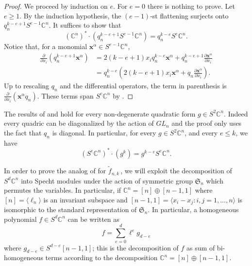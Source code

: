 \documentclass{toc}
\newcommand{\vvirg}{ , \dots , }
\newcommand{\bfx}{\mathbf{x}}
\newcommand{\bbC}{\mathbb{C}}
\newcommand{\frakS}{\mathfrak{S}}
\renewcommand{\tilde}[1]{\widetilde{#1}}
\def\BC{\mathbb C}
\begin{document}
\begin{proof} 
 We proceed by induction on $e$. For $e = 0$ there is nothing to prove. Let $e\geq 1$. By the induction hypothesis, the $(e -1)$-st flattening surjects onto $ q_n^{k-e+1} S^{e-1} \BC^{n}$. It suffices to show that 
 \[
  (\BC^{n})^* \cdot (q_n^{k-e+1} S^{e-1} \BC^{n}) = q_n^{k-e} S^e \BC^n.
 \]
Notice that, for a monomial $\bfx^\alpha \in S^{e-1} \BC^{n}$, 
\begin{align*}
\frac{\partial}{\partial x_i} (q_n^{k-e+1} \bfx^\alpha ) &= 2(k-e+1) x_i q_n^{k-e} \bfx^\alpha  + q_n^{k-e+1} \frac{\partial \bfx^\alpha }{\partial x_i}  \\ 
&= q_n^{k-e} \left(2(k-e+1) x_i  \bfx^\alpha  + q_n \frac{\partial \bfx^\alpha}{\partial x_i}\right).
\end{align*}
Up to rescaling $q_n$ and the differential operators, the term in parenthesis is $\frac{\partial}{\partial x_i} (\bfx^\alpha q_n)$. These terms span $S^{e}\BC^{n}$ by .
\end{proof}

\begin{remark}\label{rmk: Lemma holds for every quadric}
The results of  and 
hold for every  non-degenerate quadratic form $g \in S^2 \bbC^n$. Indeed every quadric can be diagonalized by the action of $GL_n$ and the proof only uses the fact that $q_n$ is diagonal. In particular, for every $g \in S^2 \bbC^n$, and every $e \leq k$, we have
\[
( S^e \bbC^n)^* \cdot (g^k ) = g^{k-e} S^{e} \bbC^n.
\]
\end{remark}

In order to prove the analog of  for $\tilde{f}_{n,k}$\,, we will exploit the decomposition of $S^d \bbC^n$ into Specht modules under the action of symmetric group $\frakS_n$ which permutes the variables. In particular, if $\bbC^n = [n] \oplus [n-1,1]$ where $[n] = \langle \ell_n \rangle$ is an invariant subspace and $[n-1,1] = \langle x_i - x_j : i,j = 1 \vvirg n\rangle$ is isomorphic to the standard representation of $\frakS_n$.   In particular, a homogeneous polynomial $f \in S^d \bbC^n$ can be written as 
\begin{equation}\label{eqn: bigraded decomp}
 f = \sum_{e = 0}^d \ell ^e g_{d-e}
\end{equation}
where $g _{d-e} \in S^{d-e} [n-1,1]$; this is the decomposition of $f$ as sum of bi-homogeneous terms according to the decomposition $\bbC^n = [n ] \oplus [n-1,1]$.
\end{document}
